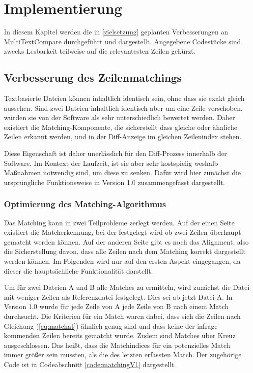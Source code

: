 \section{Implementierung}\label{implementierung}

In diesem Kapitel werden die in \ref{zielsetzung} geplanten Verbesserungen an MultiTextCompare durchgeführt und dargestellt. Angegebene Codestücke sind zwecks Lesbarkeit teilweise auf die relevantesten Zeilen gekürzt.

\subsection{Verbesserung des Zeilenmatchings}\label{verbesserungMatching}

Textbasierte Dateien können inhaltlich identisch sein, ohne dass sie exakt gleich aussehen. Sind zwei Dateien inhaltlich identisch aber um eine Zeile verschoben, würden sie von der Software als sehr unterschiedlich bewertet werden. Daher existiert die Matching-Komponente, die sicherstellt dass gleiche oder ähnliche Zeilen erkannt werden, und in der Diff-Anzeige im gleichen Zeilenindex stehen.

Diese Eigenschaft ist daher unerlässlich für den Diff-Prozess innerhalb der Software. Im Kontext der Laufzeit, ist sie aber sehr kostspielig weshalb Maßnahmen notwendig sind, um diese zu senken. Dafür wird hier zunächst die ursprüngliche Funktionsweise in Version 1.0 zusammengefasst dargestellt.

\subsubsection{Optimierung des Matching-Algorithmus}

Das Matching kann in zwei Teilprobleme zerlegt werden. Auf der einen Seite existiert die Matcherkennung, bei der festgelegt wird ob zwei Zeilen überhaupt gematcht werden können. Auf der anderen Seite gibt es noch das Alignment, also die Sicherstellung davon, dass alle Zeilen nach dem Matching korrekt dargestellt werden können. Im Folgenden wird nur auf den ersten Aspekt eingegangen, da dieser die hauptsächliche Funktionalität darstellt.

Um für zwei Dateien A und B alle Matches zu ermitteln, wird zunächst die Datei mit weniger Zeilen als Referenzdatei festgelegt. Dies sei ab jetzt Datei A. In Version 1.0 wurde für jede Zeile von A jede Zeile von B nach einem Match durchsucht. Die Kriterien für ein Match waren dabei, dass sich die Zeilen nach Gleichung (\ref{eq:matchat}) ähnlich genug sind und dass keine der infrage kommenden Zeilen bereits gematcht wurde. Zudem sind Matches \glqq über Kreuz\grqq{} ausgeschlossen. Das heißt, dass die Matchindices für ein potenzielles Match immer größer sein mussten, als die des letzten erfassten Match. Der zugehörige Code ist in Codeabschnitt \ref{code:matchingV1} dargestellt.

